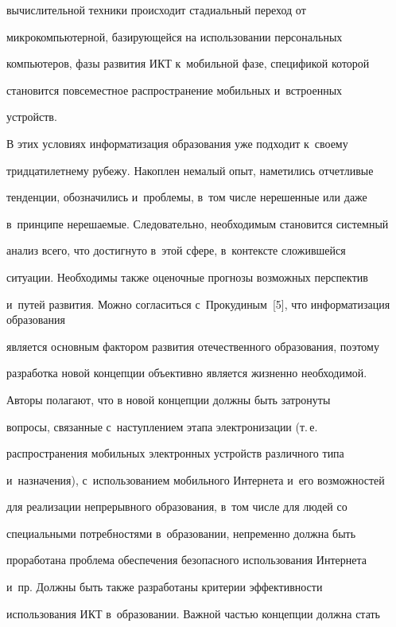 вычислительной техники происходит стадиальный переход от


микрокомпьютерной, базирующейся на использовании персональных


компьютеров, фазы развития ИКТ к~мобильной фазе, спецификой которой


становится повсеместное распространение мобильных и~встроенных


устройств.





     В этих условиях информатизация образования уже подходит к~своему


тридцатилетнему рубежу. Накоплен немалый опыт, наметились отчетливые


тенденции, обозначились и~проблемы, в~том числе нерешенные или даже


в~принципе нерешаемые. Следовательно, необходимым становится системный


анализ всего, что достигнуто в~этой сфере, в~контексте сложившейся


ситуации. Необходимы также оценочные прогнозы возможных перспектив


и~путей развития. Можно согласиться с~Прокудиным~[5], что информатизация образования


является основным фактором развития отечественного образования, поэтому


разработка новой концепции объективно является жизненно необходимой.





     Авторы полагают, что в новой концепции должны быть затронуты


вопросы, связанные с~наступлением этапа электронизации (т.\,е.\


распространения мобильных электронных устройств различного типа


и~назначения), с~использованием мобильного Интернета и~его возможностей


для реализации непрерывного образования, в~том числе для людей со


специальными потребностями в~образовании, непременно должна быть


проработана проблема обеспечения безопасного использования Интернета


и~пр. Должны быть также разработаны критерии эффективности


использования ИКТ в~образовании. Важной частью концепции должна стать


